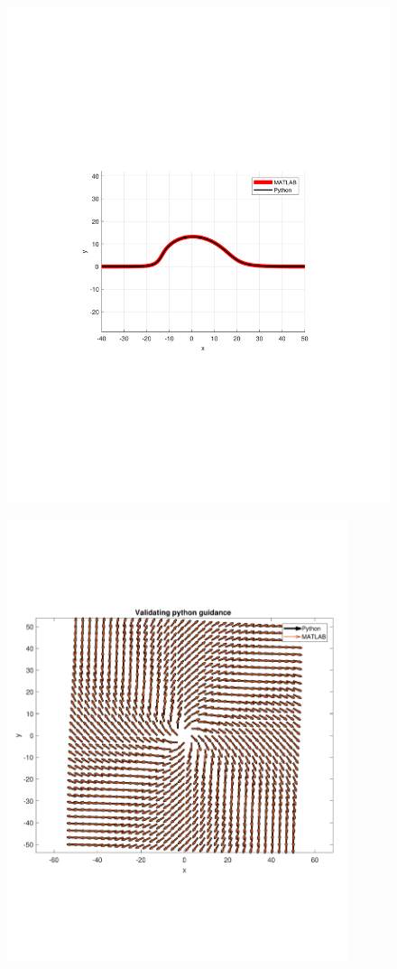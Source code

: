 \documentclass[numbered,pdftex]{ohio-etd}
\begin{document}
\begin{figure}
	\centering
	\includegraphics[trim=0 230 0 260,clip,width=16cm]{PaperFigures/Methods/resultsPython/dubinsPaths}
	\caption{}
	\label{fig:pythonMATDubins}
\end{figure}

\begin{figure}
	\centering
	\includegraphics[trim=0 140 0 140,clip,width=10cm]{PaperFigures/Methods/resultsPython/obstacle}
	\caption{}
	\label{fig:dubinspaths}
\end{figure}
\end{document}
